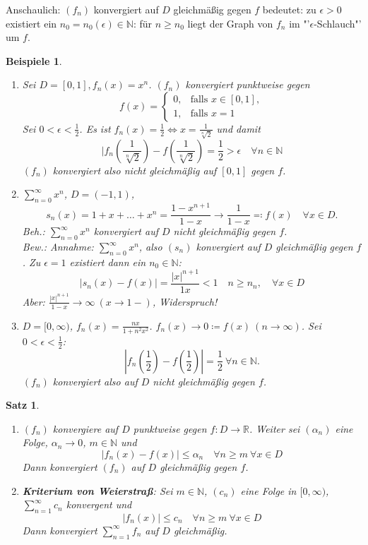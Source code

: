 \documentclass[12pt]{extreport} %
\newcommand{\N}{\mathbb{N}}
\newcommand{\R}{\mathbb{R}}
\theoremstyle{named}
\theoremstyle{dotless}
\newtheorem{satz}[unnamedtheorem]{Satz}
\newtheorem*{beispiele}{Beispiele}
\begin{document}
Anschaulich: $(f_{n})$ konvergiert auf $D$ gleichmä{\ss}ig gegen $f$ bedeutet: zu $\epsilon > 0$ existiert ein $n_{0} = n_{0}(\epsilon) \in \N$: für $n \geq n_{0}$ liegt der Graph von $f_{n}$ im "'$\epsilon$-Schlauch"' um $f$.

\begin{beispiele} ~\
	\begin{enumerate}
		\item Sei $D = [0, 1], f_{n}(x) = x^{n}$. $(f_{n})$ konvergiert punktweise gegen 
			$$ f(x) = \begin{cases} 0, & \text{falls } x \in [0, 1], \\ 1, & \text{falls } x = 1 \end{cases} $$
			Sei $0 < \epsilon < \frac{1}{2}$. Es ist $f_{n}(x) = \frac{1}{2} \iff x = \frac{1}{\sqrt[n]{2}}$ und damit
				$$ |f_{n}(\frac{1}{\sqrt[n]{2}}) - f(\frac{1}{\sqrt[n]{2}}) = \frac{1}{2} > \epsilon \quad \forall n \in \N $$
			$(f_{n})$ konvergiert also nicht gleichmä{\ss}ig auf $[0, 1]$ gegen $f$.
		\item $\sum_{n=0}^{\infty} x^{n}$, $D = (-1, 1)$, 
			$$ s_{n}(x) = 1 + x + \dotsc + x^{n} = \frac{1 - x^{n+1}}{1 - x} \rightarrow \frac{1}{1 - x} \eqqcolon f(x) \quad \forall x \in D. $$
			Beh.: $\sum_{n=0}^{\infty} x^{n}$ konvergiert auf $D$ nicht gleichmä{\ss}ig gegen $f$. \\
			Bew.: Annahme: $\sum_{n=0}^{\infty} x^{n}$, also $(s_{n})$ konvergiert auf $D$ gleichmä{\ss}ig gegen $f$. Zu $\epsilon = 1$ existiert dann ein $n_{0} \in \N$:
			$$ | s_{n}(x) - f(x) | = \frac{|x|^{n+1}}{1  x} < 1 \quad n \geq n_{n}, \quad \forall x \in D $$
			Aber: $\frac{|x|^{n+1}}{1 - x} \rightarrow \infty ~(x \rightarrow 1-)$, Widerspruch!
		\item $D = [0, \infty)$, $f_{n}(x) = \frac{nx}{1 + n^{2} x^{2}}$. $f_{n}(x) \rightarrow 0 \coloneqq f(x) ~(n \rightarrow \infty)$. Sei $0 < \epsilon < \frac{1}{2}$: 
			$$ |f_{n}(\frac{1}{2}) - f(\frac{1}{2})| = \frac{1}{2} ~\forall n \in \N. $$
			$(f_{n})$ konvergiert also auf $D$ nicht gleichmäßig gegen $f$.
	\end{enumerate}	
\end{beispiele}

\begin{satz} ~\ \label{8.1:satz}
	\begin{enumerate}
		\item $(f_{n})$ konvergiere auf $D$ punktweise gegen $f \colon D \rightarrow \R$. Weiter sei $(\alpha_{n})$ eine Folge, $\alpha_{n} \rightarrow 0$, $m \in \N$ und
			$$ |f_{n}(x) - f(x) | \leq \alpha_{n} \quad \forall n \geq m ~\forall x \in D $$
			Dann konvergiert $(f_{n})$ auf $D$ gleichmä{\ss}ig gegen $f$. \label{8.1.a:satz}
		\item \textbf{Kriterium von Weierstra{\ss}}: Sei $m \in \N$, $(c_{n})$ eine Folge in $[0, \infty)$, $\sum_{n=1}^{\infty} c_{n}$ konvergent und
			$$ | f_{n}(x) | \leq c_{n} \quad \forall n \geq m ~\forall x \in D $$
			Dann konvergiert $\sum_{n=1}^{\infty} f_{n}$ auf $D$ gleichmä{\ss}ig. \label{8.1.b:satz}
	\end{enumerate}
\end{satz}
\end{document}
